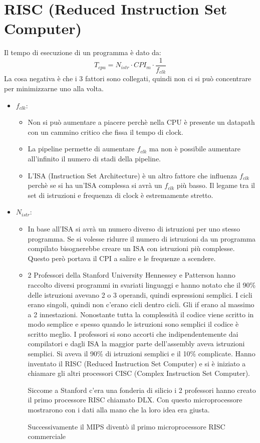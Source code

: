\documentclass[a4paper]{article}
\theoremstyle{break}
\theoremstyle{break}
\theoremstyle{break}
\theoremstyle{break}
\begin{document}
\section{RISC (Reduced Instruction Set Computer)}
Il tempo di esecuzione di un programma è dato da:
\[
  T_{cpu} = N_{istr} \cdot CPI_{m} \cdot \frac{1}{f_{clk}}
\] 
La cosa negativa è che i 3 fattori sono collegati, quindi non ci si può concentrare
per minimizzarne uno alla volta.
\begin{itemize}
  \item \( f_{clk} \): 
    \begin{itemize}
      \item 
        Non si può aumentare a piacere perchè nella CPU è presente
        un datapath con un cammino critico che fissa il tempo di clock.
      \item La pipeline permette di aumentare \( f_{clk} \) ma non
        è possibile aumentare all'infinito il numero di stadi della pipeline.
      \item L'ISA (Instruction Set Architecture) è un altro fattore che
        influenza \( f_{clk} \) perchè se si ha un'ISA complessa si avrà
        un \( f_{clk} \) più basso. Il legame tra il set di istruzioni
        e frequenza di clock è estremamente stretto.
    \end{itemize}
  \item \( N_{istr} \):
    \begin{itemize}
      \item In base all'ISA si avrà un numero diverso di istruzioni per uno
        stesso programma. Se si volesse ridurre il numero di istruzioni da
        un programma compilato bisognerebbe creare un ISA con istruzioni più
        complesse. Questo però portava il CPI a salire e le frequenze a scendere.
      \item 2 Professori della Stanford University Hennessey e Patterson
        hanno raccolto diversi programmi in svariati linguaggi e hanno notato
        che il 90\% delle istruzioni avevano 2 o 3 operandi, quindi espressioni
        semplici. I cicli erano singoli, quindi non c'erano cicli dentro cicli.
        Gli if erano al massimo a 2 innestazioni. Nonostante tutta la complessità
        il codice viene scritto in modo semplice e spesso quando le istruzioni
        sono semplici il codice è scritto meglio. I professori si sono accorti
        che indipendentemente dai compilatori e dagli ISA la maggior parte
        dell'assembly aveva istruzioni semplici. Si aveva il 90\% di istruzioni
        semplici e il 10\% complicate. Hanno inventato il RISC (Reduced Instruction Set Computer)
        e si è iniziato a chiamare gli altri processori CISC (Complex Instruction Set Computer).

        \noindent Siccome a Stanford c'era una fonderia di silicio i 2 professori
        hanno creato il primo processore RISC chiamato DLX. Con questo microprocessore
        mostrarono con i dati alla mano che la loro idea era giusta.

        \noindent Successivamente il MIPS diventò il primo microprocessore RISC
        commerciale
    \end{itemize}
\end{itemize}
\end{document}
